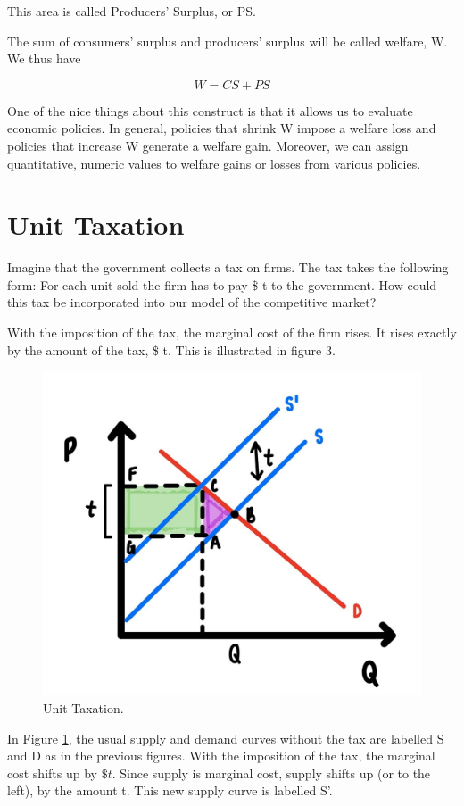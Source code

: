 \documentclass[
]{book}
\begin{document}
This area is called Producers' Surplus, or PS.

The sum of consumers' surplus and producers' surplus will be called welfare, W. We thus have

\[W = CS + PS\]

One of the nice things about this construct is that it allows us to evaluate economic policies. In general, policies that shrink W impose a welfare loss and policies that increase W generate a welfare gain. Moreover, we can assign quantitative, numeric values to welfare gains or losses from various policies.

\hypertarget{unit-taxation}{%
\section{Unit Taxation}\label{unit-taxation}}

Imagine that the government collects a tax on firms. The tax takes the following form: For each unit sold the firm has to pay \$ t to the government. How could this tax be incorporated into our model of the competitive market?

With the imposition of the tax, the marginal cost of the firm rises. It rises exactly by the amount of the tax, \$ t. This is illustrated in figure 3.

\begin{figure}

{\centering \includegraphics[width=0.5\linewidth]{img/compmarkets/fig3} 

}

\caption{Unit Taxation.}\label{fig:compmarkets03}
\end{figure}

In Figure \ref{fig:compmarkets03}, the usual supply and demand curves without the tax are labelled S and D as in the previous figures. With the imposition of the tax, the marginal cost shifts up by \(\$t\). Since supply is marginal cost, supply shifts up (or to the left), by the amount t. This new supply curve is labelled S'.
\end{document}
